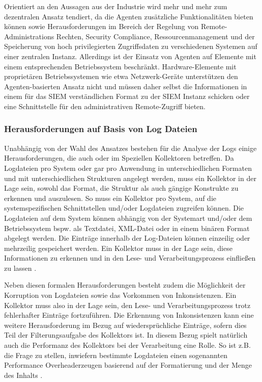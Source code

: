 Orientiert an den Aussagen aus der Industrie wird mehr und mehr zum dezentralen Ansatz tendiert, da die Agenten zusätzliche Funktionalitäten bieten können sowie Herausforderungen im Bereich der Regelung von Remote-Administrations Rechten, Security Compliance, Ressourcenmanagement und der Speicherung von hoch privilegierten Zugriffsdaten zu verschiedenen Systemen auf einer zentralen Instanz. Allerdings ist der Einsatz von Agenten auf Elemente mit einem entsprechenden Betriebssystem beschränkt. Hardware-Elemente mit proprietären Betriebssystemen wie etwa Netzwerk-Geräte unterstützen den Agenten-basierten Ansatz nicht und müssen daher selbst die Informationen in einem für das SIEM verständlichen Format zu der SIEM Instanz schicken oder eine Schnittstelle für den administrativen Remote-Zugriff bieten.


\subsubsection{Herausforderungen auf Basis von Log Dateien}
Unabhängig von der Wahl des Ansatzes bestehen für die Analyse der Logs einige Herausforderungen, die auch oder im Speziellen Kollektoren betreffen. Da Logdateien pro System oder gar pro Anwendung in unterschiedlichen Formaten und mit unterschiedlichen Strukturen angelegt werden, muss ein Kollektor in der Lage sein, sowohl das Format, die Struktur als auch gängige Konstrukte zu erkennen und auszulesen. So muss ein Kollektor pro System, auf die systemspezifischen Schnittstellen und/oder Logdateien zugreifen können. Die Logdateien auf dem System können abhängig von der Systemart und/oder dem Betriebssystem bspw. als Textdatei, XML-Datei oder in einem binären Format abgelegt werden. Die Einträge innerhalb der Log-Dateien können einzeilig oder mehrzeilig gespeichert werden. Ein Kollektor muss in der Lage sein, diese Informationen zu erkennen und in den Lese- und Verarbeitungsprozess einfließen zu lassen \citep{6261962}. 

Neben diesen formalen Herausforderungen besteht zudem die Möglichkeit der Korruption von Logdateien sowie das Vorkommen von Inkonsistenzen. Ein Kollektor muss also in der Lage sein, den Lese- und Verarbeitungsprozess trotz fehlerhafter Einträge fortzuführen. Die Erkennung von Inkonsistenzen kann eine weitere Herausforderung im Bezug auf wiedersprüchliche Einträge, sofern dies Teil der Filterungsaufgabe des Kollektors ist. In diesem Bezug spielt natürlich auch die Performanz des Kollektors bei der Verarbeitung eine Rolle. So ist z.B. die Frage zu stellen, inwiefern bestimmte Logdateien einen sogenannten \glqq Performance Overhead\grqq  erzeugen basierend auf der Formatierung und der Menge des Inhalts \citep{6261962}.


